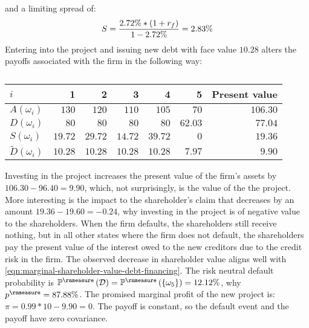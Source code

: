 \documentclass[main.tex]{subfiles}
\begin{document}
        and a limiting spread of:
        \begin{equation}
            S 
            = \frac{
                2.72\% * (1 + r_{f})
            }{
                1 - 2.72\%
            } 
            = 2.83\%
        \end{equation}
        Entering into the project and issuing new debt with face value $10.28$ 
        alters the payoffs associated with the firm in the following way:
        \begin{table}[H]
            \centering
            \begin{tabular}{l|rrrrr||r}
                $i$ & 1 & 2 & 3 & 4 & 5 & Present value \\
                \hline
                $A(\omega_{i})$ & $130$ & $120$ & $110$ & $105$ & $70$ & $106.30$ \\
                $D(\omega_{i})$ & $80$ & $80$ & $80$ & $80$ & $62.03$ & $77.04$ \\
                $S(\omega_{i})$ & $19.72$ & $29.72$ & $14.72$ & $39.72$ & $0$ & $19.36$ \\
                $\tilde{D}(\omega_{i})$ & $10.28$ & $10.28$ & $10.28$ & $10.28$ & $7.97$ & $9.90$ \\
            \end{tabular}
            \caption{}
        \end{table}

        Investing in the project increases the present value of the firm's assets by $106.30 - 96.40 = 9.90$, 
        which, not surprisingly, is the value of the the project.
        More interesting is the impact to the shareholder's claim that decreases by an amount $19.36 - 19.60 = -0.24$, 
        why investing in the project is of negative value to the shareholders.
        When the firm defaults, the shareholders still receive nothing, 
        but in all other states where the firm does not default, 
        the shareholders pay the present value of the interest owed to the new creditors 
        due to the credit risk in the firm.
        The observed decrease in shareholder value aligns well with 
        \cref{eqn:marginal-shareholder-value-debt-financing}. 
        The risk neutral default probability is 
        $\mathbb{P}^{\rnmeasure}\left(\mathcal{D}\right) 
            = \mathbb{P}^{\rnmeasure}\left(\{\omega_{5}\}\right) 
            = 12.12\%$,
        why $p^{\rnmeasure} = 87.88\%$.
        The promised marginal profit of the new project is:
        $\pi = 0.99 * 10 - 9.90 = 0$.
        The payoff is constant, so the default event and the payoff have zero covariance. 
        
\end{document}
